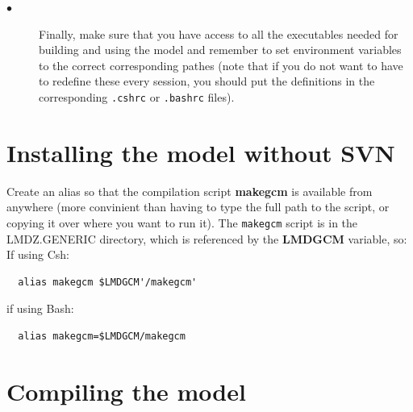 \begin{description}
\item[$\bullet$] Finally, make sure that you have access to all the executables
needed for building and using the model and
remember to set environment variables to the correct corresponding pathes
(note that if you do not want to have to redefine these every session,
you should put the definitions in the corresponding {\tt .cshrc} or
{\tt .bashrc} files).


\end{description}


\section{Installing the model without SVN}

 Create an alias so that the compilation script {\bf makegcm}
  is available from anywhere (more convinient than having to type the full
  path to the script, or copying it over where you want to run it).
  The {\tt makegcm} script is in the LMDZ.GENERIC directory, which
  is referenced by the {\bf LMDGCM} variable, so:\\
  If using Csh:
  \begin{verbatim}
  alias makegcm $LMDGCM'/makegcm'
  \end{verbatim}
  if using Bash:
  \begin{verbatim}
  alias makegcm=$LMDGCM/makegcm
  \end{verbatim}

\section{Compiling the model}
\label{sc:run1}

